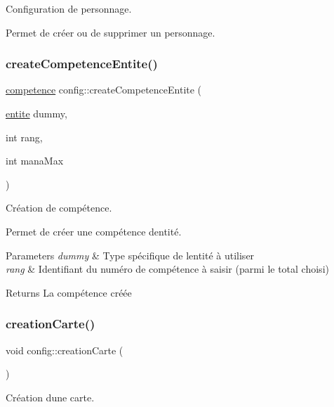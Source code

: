 Configuration de personnage. 

Permet de créer ou de supprimer un personnage. \mbox{\label{classconfig_a9311924c3fc7e8cef221c1fec32c832e}} 
\subsubsection{\texorpdfstring{create\+Competence\+Entite()}{createCompetenceEntite()}}
{\footnotesize\ttfamily \hyperlink{classcompetence}{competence} config\+::create\+Competence\+Entite (\begin{DoxyParamCaption}\item[{\hyperlink{classentite}{entite}}]{dummy,  }\item[{int}]{rang,  }\item[{int}]{mana\+Max }\end{DoxyParamCaption})}



Création de compétence. 

Permet de créer une compétence d\textquotesingle{}entité. 
\begin{DoxyParams}{Parameters}
{\em dummy} & Type spécifique de l\textquotesingle{}entité à utiliser \\
\hline
{\em rang} & Identifiant du numéro de compétence à saisir (parmi le total choisi) \\
\hline
\end{DoxyParams}
\begin{DoxyReturn}{Returns}
La compétence créée 
\end{DoxyReturn}
\mbox{\label{classconfig_a74e51912220c662f35a45146e8ea4d41}} 
\subsubsection{\texorpdfstring{creation\+Carte()}{creationCarte()}}
{\footnotesize\ttfamily void config\+::creation\+Carte (\begin{DoxyParamCaption}{ }\end{DoxyParamCaption})}



Création d\textquotesingle{}une carte. 

